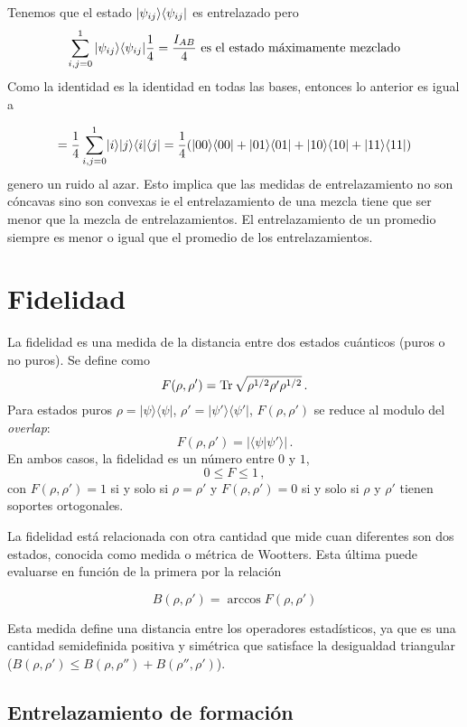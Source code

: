 Tenemos que el estado $|\psi_{ij} \rangle\langle \psi_{ij}|$ es entrelazado
pero 
\[
\sum_{i,j=0}^{1}|\psi_{ij} \rangle\langle \psi_{ij}|\frac{1}{4}=\frac{I_{AB}}{4}\text{ es el estado máximamente mezclado}
\]
Como la identidad es la identidad en todas las bases, entonces lo
anterior es igual a 

\[
=\frac{1}{4}\sum_{i,j=0}^{1}\KET i\KET j\BRA i\BRA j=\frac{1}{4}\PARENTESIS{\KET{00}\BRA{00}+\KET{01}\BRA{01}+\KET{10}\BRA{10}+\KET{11}\BRA{11}}
\]
genero un ruido al azar. Esto implica que las medidas de entrelazamiento
no son cóncavas sino son convexas ie el entrelazamiento de una mezcla
tiene que ser menor que la mezcla de entrelazamientos. El entrelazamiento
de un promedio siempre es menor o igual que el promedio de los entrelazamientos. 

\section{Fidelidad} 
La fidelidad \cite{NC.00} es una medida de la distancia entre dos estados cuánticos (puros o no puros).
Se define como 
\begin{equation}
F(\rho,\rho')={\rm Tr}\,\sqrt{\rho^{1/2}\rho'\rho^{1/2}}\,.
\end{equation}
Para estados puros $\rho=|\psi\rangle\langle\psi|$, 
$\rho'=|\psi'\rangle\langle\psi'|$, $F(\rho,\rho')$ se reduce al modulo del {\it overlap}:
\begin{equation}
F(\rho,\rho')=|\langle \psi|\psi'\rangle|\,.\end{equation}
En ambos casos, la fidelidad es un número entre $0$ y $1$,
\[0\leq F\leq 1\,,\]
con $F(\rho,\rho')=1$ si y solo si $\rho=\rho'$ y $F(\rho,\rho')=0$ si y solo si $\rho$ y $\rho'$ tienen soportes ortogonales. 

La fidelidad está relacionada con otra cantidad que mide cuan diferentes son dos estados, conocida como medida o m\'etrica de Wootters. Esta última puede evaluarse en función de la primera por la relación

\begin{equation}
B(\rho,\rho')=\arccos F(\rho,\rho') 
\label{metric}
\end{equation}

Esta medida define una distancia entre los operadores estadísticos, ya que es una cantidad semidefinida positiva y simétrica que satisface la desigualdad triangular 
($B(\rho,\rho')\leq B(\rho,\rho'')+B(\rho'',\rho')$). 

\subsection{Entrelazamiento de formación}

